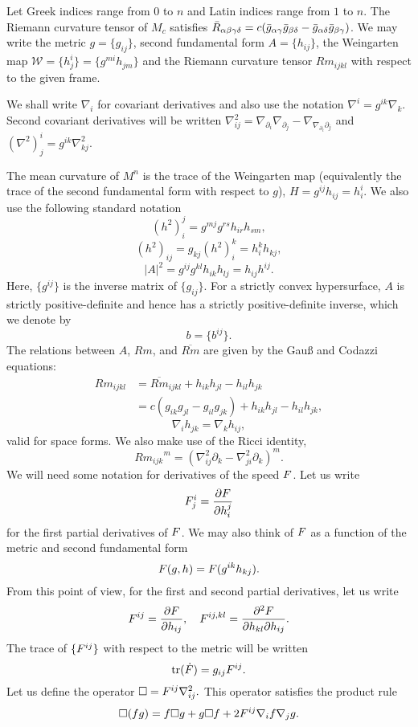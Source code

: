 \documentclass{amsart}
\begin{document}
Let Greek indices range from \(0\) to \(n\) and Latin indices range from \(1\) to \(n\). The Riemann curvature tensor of \(M_c\) satisfies \(\bar{R}_{\alpha\beta\gamma\delta} = c(\bar{g}_{\alpha\gamma}\bar{g}_{\beta\delta} - \bar{g}_{\alpha\delta}\bar{g}_{\beta\gamma})\). We may write the metric $g = \{g_{ij}\}$, second fundamental form $A = \{h_{ij}\}$, the Weingarten map $\mathcal{W} = \{h^i_j\} = \{g^{mi} h_{jm}\}$ and the Riemann curvature tensor $Rm_{ijkl}$ with respect to the given frame.

We shall write \(\nabla_i\) for covariant derivatives and also use the notation \(\nabla^i = g^{ik} \nabla_k\). Second covariant derivatives will be written \(\nabla^2_{ij} = \nabla_{\partial_i} \nabla_{\partial_j} - \nabla_{\nabla_{\partial_i}\partial_j}\) and \((\nabla^2)^i_j = g^{ik} \nabla^2_{kj}\).

The mean curvature of $M^n$ is the trace of the Weingarten map (equivalently the trace of the second fundamental form with respect to $g$), $H = g^{ij}h_{ij} = h^i_i$. We also use the following standard notation
\[
(h^2)_i^j = g^{mj}g^{rs}h_{ir}h_{sm},
\]
\[
(h^2)_{ij} = g_{kj} (h^2)_i^k = h^k_i h_{kj},
\]
\[
|A|^2 = g^{ij}g^{kl}h_{ik}h_{lj} = h_{ij}h^{ij}.
\]
Here, $\{g^{ij}\}$ is the inverse matrix of $\{g_{ij}\}.$ For a strictly convex hypersurface, \(A\) is strictly positive-definite and hence has a strictly positive-definite inverse, which we denote by
\[
b = \{b^{ij}\}.
\]
The relations between $A$, $Rm$, and $\overline{Rm}$ are given by the Gau{\ss} and Codazzi equations:
\[
\begin{split}
Rm_{ijkl} &= \overline{Rm}_{ijkl} + h_{ik}h_{jl} - h_{il}h_{jk} \\
&= c({g}_{ik}{g}_{jl} - {g}_{il}{g}_{jk}) + h_{ik}h_{jl} - h_{il}h_{jk},
\end{split}
\]
\[
\nabla_i h_{jk} = \nabla_k h_{ij},
\]
valid for space forms. We also make use of the Ricci identity,
\[
{{Rm}_{ijk}}^{m}  = \left(\nabla^2_{ij} \partial_k - \nabla^2_{ji} \partial_k\right)^m.
\]
We will need some notation for derivatives of the speed \(F\). Let us write
\[
F^{i}_{j} = \frac{\partial F}{\partial h^{j}_{i}}
\]
for the first partial derivatives of \(F\). We may also think of \(F\) as a function of the metric and second fundamental form
\[
F(g, h) = F(g^{ik} h_{kj}).
\]
From this point of view, for the first and second partial derivatives, let us write
\[
F^{ij} = \frac{\partial F}{\partial h_{ij}}, \quad F^{ij,kl} = \frac{\partial^2F}{\partial h_{kl} \partial h_{ij}}.
\]
The trace of $\{F^{ij}\}$ with respect to the metric will be written
\[
\operatorname{tr}(\dot{F}) = g_{ij} F^{ij}.
\]
Let us define the operator
$
\Box = F^{ij} \nabla^2_{ij}.
$
This operator satisfies the product rule
\begin{equation}
\label{eq:productbox}
\Box (fg) = f \Box g + g \Box f + 2 F^{ij} \nabla_i f \nabla_j g.
\end{equation}
\end{document}
